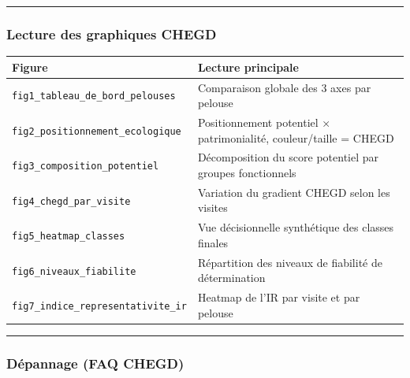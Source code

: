 \begin{center}\rule{0.5\linewidth}{0.5pt}\end{center}

\subsubsection{Lecture des graphiques
CHEGD}\label{lecture-des-graphiques-chegd}

{\def\LTcaptype{none} %
\begin{longtable}[]{@{}
  >{\raggedright\arraybackslash}p{}
  >{\raggedright\arraybackslash}p{}@{}}
\toprule\noalign{}
\begin{minipage}[b]{\linewidth}\raggedright
Figure
\end{minipage} & \begin{minipage}[b]{\linewidth}\raggedright
Lecture principale
\end{minipage} \\
\midrule\noalign{}
\endhead
\bottomrule\noalign{}
\endlastfoot
\texttt{fig1\_tableau\_de\_bord\_pelouses} & Comparaison globale des 3
axes par pelouse \\
\texttt{fig2\_positionnement\_ecologique} & Positionnement potentiel ×
patrimonialité, couleur/taille = CHEGD \\
\texttt{fig3\_composition\_potentiel} & Décomposition du score potentiel
par groupes fonctionnels \\
\texttt{fig4\_chegd\_par\_visite} & Variation du gradient CHEGD selon
les visites \\
\texttt{fig5\_heatmap\_classes} & Vue décisionnelle synthétique des
classes finales \\
\texttt{fig6\_niveaux\_fiabilite} & Répartition des niveaux de fiabilité
de détermination \\
\texttt{fig7\_indice\_representativite\_ir} & Heatmap de l'IR par visite
et par pelouse \\
\end{longtable}
}

\begin{center}\rule{0.5\linewidth}{0.5pt}\end{center}

\subsubsection{Dépannage (FAQ CHEGD)}\label{duxe9pannage-faq-chegd}

